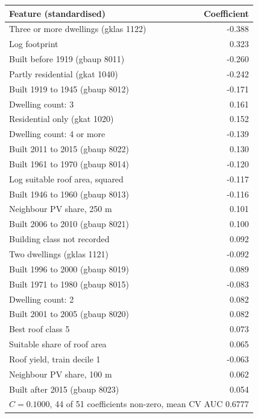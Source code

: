 \begin{tabular}{lr}
\toprule
Feature (standardised) & Coefficient \\
\midrule
Three or more dwellings (gklas 1122) & -0.388 \\
Log footprint & 0.323 \\
Built before 1919 (gbaup 8011) & -0.260 \\
Partly residential (gkat 1040) & -0.242 \\
Built 1919 to 1945 (gbaup 8012) & -0.171 \\
Dwelling count: 3 & 0.161 \\
Residential only (gkat 1020) & 0.152 \\
Dwelling count: 4 or more & -0.139 \\
Built 2011 to 2015 (gbaup 8022) & 0.130 \\
Built 1961 to 1970 (gbaup 8014) & -0.120 \\
Log suitable roof area, squared & -0.117 \\
Built 1946 to 1960 (gbaup 8013) & -0.116 \\
Neighbour PV share, 250 m & 0.101 \\
Built 2006 to 2010 (gbaup 8021) & 0.100 \\
Building class not recorded & 0.092 \\
Two dwellings (gklas 1121) & -0.092 \\
Built 1996 to 2000 (gbaup 8019) & 0.089 \\
Built 1971 to 1980 (gbaup 8015) & -0.083 \\
Dwelling count: 2 & 0.082 \\
Built 2001 to 2005 (gbaup 8020) & 0.082 \\
Best roof class 5 & 0.073 \\
Suitable share of roof area & 0.065 \\
Roof yield, train decile 1 & -0.063 \\
Neighbour PV share, 100 m & 0.062 \\
Built after 2015 (gbaup 8023) & 0.054 \\
\midrule
\multicolumn{2}{l}{$C = 0.1000$, 44 of 51 coefficients non-zero, mean CV AUC 0.6777} \\
\bottomrule
\end{tabular}
